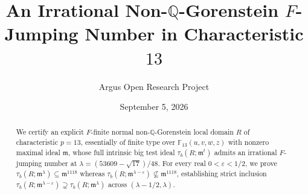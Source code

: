 \documentclass[10pt,reqno]{amsart}
\title[An Irrational Non-$\mathbb{Q}$-Gorenstein $F$-Jumping Number]
{An Irrational Non-$\mathbb{Q}$-Gorenstein $F$-Jumping Number in Characteristic $13$}
\author{Argus Open Research Project}
\date{September 5, 2026}
\theoremstyle{definition}
\begin{document}
\begin{abstract}
We certify an explicit $F$-finite normal non-$\mathbb{Q}$-Gorenstein local domain $R$ of characteristic $p=13$, essentially of finite type over $\mathbb{F}_{13}(u,v,w,z)$ with nonzero maximal ideal $\mathfrak{m}$, whose full intrinsic big test ideal $\tau_b(R;\mathfrak{m}^t)$ admits an irrational $F$-jumping number at $\lambda=(53609-\sqrt{17})/48$. For every real $0<\varepsilon<1/2$, we prove $\tau_b(R;\mathfrak{m}^\lambda)\subseteq\mathfrak{m}^{1118}$ whereas $\tau_b(R;\mathfrak{m}^{\lambda-\varepsilon})\not\subseteq\mathfrak{m}^{1118}$, establishing strict inclusion $\tau_b(R;\mathfrak{m}^{\lambda-\varepsilon})\supsetneq\tau_b(R;\mathfrak{m}^\lambda)$ across $( \lambda-1/2,\lambda )$.
\end{abstract}
\maketitle
\end{document}
